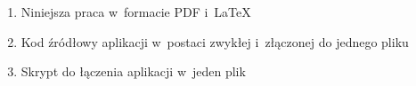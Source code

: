 \begin{enumerate}
\item Niniejsza praca w~formacie PDF i~\LaTeX
\item Kod źródłowy aplikacji w~postaci zwykłej i~złączonej do jednego pliku
\item Skrypt do łączenia aplikacji w~jeden plik
\end{enumerate}
